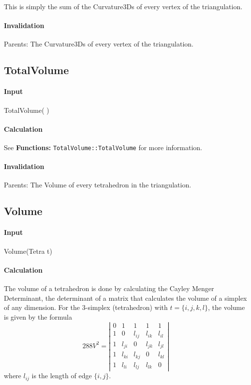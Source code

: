 This is simply the sum of the Curvature3Ds of every vertex of the
triangulation.

\paragraph{Invalidation}

Parents: The Curvature3Ds of every vertex of the triangulation.

\bigskip

\subsection{TotalVolume}

\paragraph{Input}

TotalVolume( )

\paragraph{Calculation}

See \textbf{Functions: }\texttt{TotalVolume::TotalVolume} for more
information.

\paragraph{Invalidation}

\bigskip Parents: The Volume of every tetrahedron in the triangulation.

\subsection{Volume}

\paragraph{Input}

Volume(Tetra t)

\paragraph{Calculation}

The volume of a tetrahedron is done by calculating the Cayley Menger
Determinant, the determinant of a matrix that calculates the volume of a
simplex of any dimension. For the 3-simplex (tetrahedron) with $t=\{i,j,k,l\}
$, the volume is given by the formula 
\begin{equation*}
288V^{2}=\left\vert 
\begin{array}{ccccc}
0 & 1 & 1 & 1 & 1 \\ 
1 & 0 & l_{ij} & l_{ik} & l_{il} \\ 
1 & l_{ji} & 0 & l_{jk} & l_{jl} \\ 
1 & l_{ki} & l_{kj} & 0 & l_{kl} \\ 
1 & l_{li} & l_{lj} & l_{lk} & 0%
\end{array}%
\right\vert 
\end{equation*}%
where $l_{ij}$ is the length of edge $\{i,j\}$.

